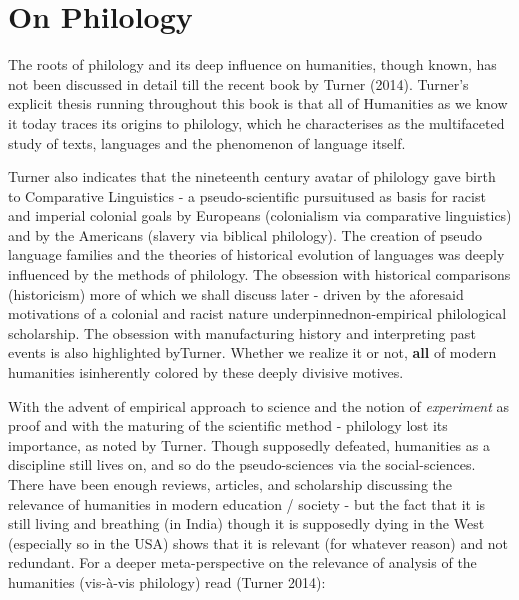 \section*{On Philology}

The roots of philology and its deep influence on humanities, though known, has not been discussed in detail till the recent book by Turner (2014). Turner’s explicit thesis running throughout this book is that all of Humanities as we know it today traces its origins to philology, which he characterises as the multifaceted study of texts, languages and the phenomenon of language itself.

Turner also indicates that the nineteenth century avatar of philology gave birth to Comparative Linguistics - a pseudo-scientific pursuit\break used as basis for racist and imperial colonial goals by Europeans (colonialism via comparative linguistics) and by the Americans (slavery via biblical philology). The creation of pseudo language families and the theories of historical evolution of languages was deeply influenced by the methods of philology. The obsession with historical comparisons (historicism) more of which we shall discuss later - driven by the aforesaid motivations of a colonial and racist nature underpinned\break non-empirical philological scholarship. The obsession with manufacturing history and interpreting past events is also highlighted by\break Turner. Whether we realize it or not, \textbf{all} of modern humanities is\break inherently colored by these deeply divisive motives.

With the advent of empirical approach to science and the notion of \textit{experiment} as proof and with the maturing of the scientific method - philology lost its importance, as noted by Turner. Though supposedly defeated, humanities as a discipline still lives on, and so do the pseudo-sciences via the social-sciences. There have been enough reviews, articles, and scholarship discussing the relevance of humanities in modern education / society - but the fact that it is still living and breathing (in India) though it is supposedly dying in the West (especially so in the USA) shows that it is relevant (for whatever reason) and not redundant. For a deeper meta-perspective on the relevance of analysis of the humanities (vis-à-vis philology) read (Turner 2014):

\vskip 3pt

